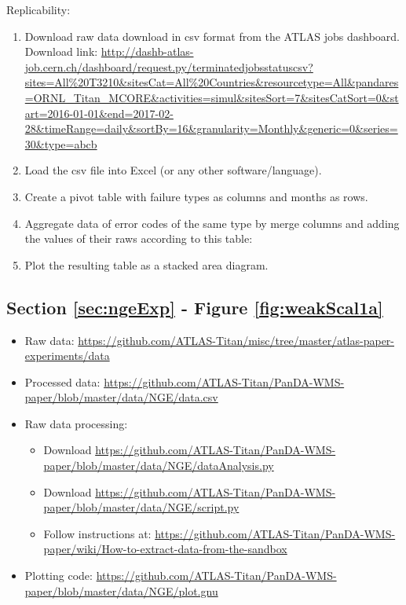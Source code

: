 Replicability:

\begin{enumerate}
    \item Download raw data download in csv format from the ATLAS jobs dashboard. Download link: \url{http://dashb-atlas-job.cern.ch/dashboard/request.py/terminatedjobsstatuscsv?sites=All%20T3210&sitesCat=All%20Countries&resourcetype=All&pandares=ORNL_Titan_MCORE&activities=simul&sitesSort=7&sitesCatSort=0&start=2016-01-01&end=2017-02-28&timeRange=daily&sortBy=16&granularity=Monthly&generic=0&series=30&type=abcb}
    \item Load the csv file into Excel (or any other software/language).
    \item Create a pivot table with failure types as columns and months as rows.
    \item Aggregate data of error codes of the same type by merge columns and adding the values of their raws according to this table:
    \item Plot the resulting table as a stacked area diagram.
\end{enumerate}


\subsection{Section \ref{sec:ngeExp} - Figure \ref{fig:weakScal1a}}
\label{apndx:fig9}

\begin{itemize}
    \item Raw data: \url{https://github.com/ATLAS-Titan/misc/tree/master/atlas-paper-experiments/data}
     \item Processed data: \url{ https://github.com/ATLAS-Titan/PanDA-WMS-paper/blob/master/data/NGE/data.csv} 
    \item Raw data processing: 
    	\begin{itemize}
    		\item Download \url{https://github.com/ATLAS-Titan/PanDA-WMS-paper/blob/master/data/NGE/dataAnalysis.py}
    		\item Download \url{https://github.com/ATLAS-Titan/PanDA-WMS-paper/blob/master/data/NGE/script.py}
    		\item Follow instructions at: \url{https://github.com/ATLAS-Titan/PanDA-WMS-paper/wiki/How-to-extract-data-from-the-sandbox}
   	\end{itemize}
    \item Plotting code: \url{https://github.com/ATLAS-Titan/PanDA-WMS-paper/blob/master/data/NGE/plot.gnu}
\end{itemize}

